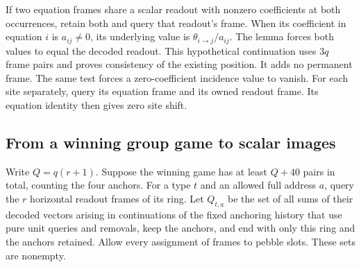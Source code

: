 \documentclass[11pt]{article}
\theoremstyle{definition}
\theoremstyle{remark}
\numberwithin{equation}{section}
\begin{document}
If two equation frames share a scalar readout with nonzero coefficients
at both occurrences, retain both and query that readout's frame. When its coefficient
in equation $i$ is $a_{ij}\ne0$, its underlying value is
$\theta_{i\to j}/a_{ij}$. The lemma forces both values to equal the
decoded readout. This hypothetical continuation uses $3q$ frame pairs
and proves consistency of the existing position. It adds no permanent
frame. The same test forces a zero-coefficient incidence value to vanish.
For each site separately, query its equation frame and its owned
readout frame. Its equation identity then gives zero site shift.

\subsection{From a winning group game to scalar images}

Write $Q=q(r+1)$. Suppose the winning game has at least
$Q+40$ pairs in total, counting the four anchors. For a type $t$ and an allowed full address $a$,
query the $r$ horizontal readout frames of its ring. Let $Q_{t,a}$ be
the set of all sums of their decoded vectors arising in continuations
of the fixed anchoring history that use pure unit queries and removals,
keep the anchors, and end
with only this ring and the anchors retained. Allow every assignment
of frames to pebble slots. These sets are nonempty.
\end{document}
